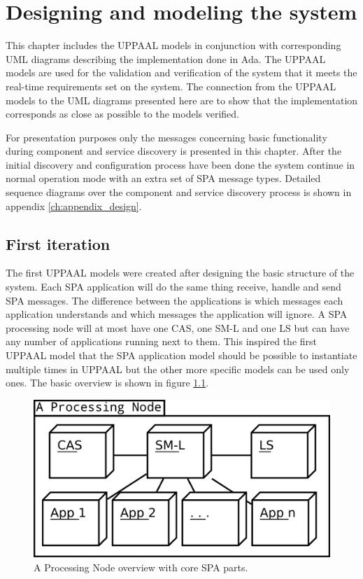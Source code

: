 \chapter{Designing and modeling the system}\label{ch:uppaal_models}
This chapter includes the UPPAAL models in conjunction with corresponding UML
diagrams describing the implementation done in Ada. The UPPAAL models are used
for the validation and verification of the system that it meets the real-time
requirements set on the system. The connection from the UPPAAL models to the
UML diagrams presented here are to show that the implementation corresponds as
close as possible to the models verified.

For presentation purposes only the messages concerning basic functionality
during component and service discovery is presented in this chapter. After the
initial discovery and configuration process have been done the system continue
in normal operation mode with an extra set of SPA message types. Detailed
sequence diagrams over the component and service discovery process is shown in
appendix \ref{ch:appendix_design}.

\section{First iteration}
The first UPPAAL models were created after designing the basic structure of the
system. Each SPA application will do the same thing receive, handle and send
SPA messages. The difference between the applications is which messages each
application understands and which messages the application will ignore. A SPA
processing node will at most have one CAS, one SM-L and one LS but can have any
number of applications running next to them. This inspired the first UPPAAL
model that the SPA application model should be possible to instantiate multiple
times in UPPAAL but the other more specific models can be used only ones. The
basic overview is shown in figure \ref{fig:processing_node_overview}.

\begin{figure}[h]
    \centering
    \includegraphics[width=\textwidth]{figures/processing_node_overview}
    \caption{A Processing Node overview with core SPA parts.}
    \label{fig:processing_node_overview}
\end{figure}


